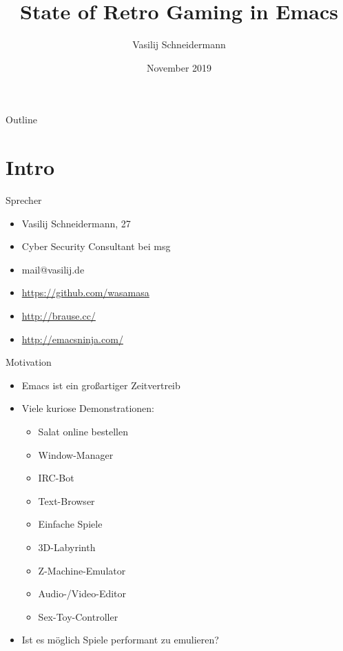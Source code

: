 \documentclass[presentation]{beamer}
\author{Vasilij Schneidermann}
\date{November 2019}
\title{State of Retro Gaming in Emacs}
\begin{document}
\maketitle
\begin{frame}{Outline}
\tableofcontents
\end{frame}

\AtBeginSection{\frame{\sectionpage}}

\section{Intro}
\label{sec:org75dc689}

\begin{frame}[label={sec:org9a56e35}]{Sprecher}
\begin{itemize}
\item Vasilij Schneidermann, 27
\item Cyber Security Consultant bei msg
\item mail@vasilij.de
\item \url{https://github.com/wasamasa}
\item \url{http://brause.cc/}
\item \url{http://emacsninja.com/}
\end{itemize}
\end{frame}

\begin{frame}[label={sec:orgbd5209f}]{Motivation}
\begin{itemize}
\item Emacs ist ein großartiger Zeitvertreib
\item Viele kuriose Demonstrationen:
\begin{itemize}
\item Salat online bestellen
\item Window-Manager
\item IRC-Bot
\item Text-Browser
\item Einfache Spiele
\item 3D-Labyrinth
\item Z-Machine-Emulator
\item Audio-/Video-Editor
\item Sex-Toy-Controller
\end{itemize}
\item Ist es möglich Spiele performant zu emulieren?
\end{itemize}
\end{frame}
\end{document}
